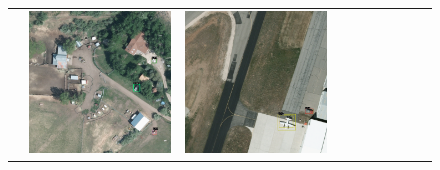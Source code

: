 \begin{figure}[h!]
\begin{tabularx}{\textwidth}{c|*{9}{X}}
    & \includegraphics[trim={850pt 110pt 80pt 830pt},clip,width=\linewidth]{images/015Results/01abb_vs_obb/comp_images/abb/523.png}
    &  \includegraphics[trim={650pt 120pt 170pt 720pt},clip,width=\linewidth]{images/015Results/01abb_vs_obb/comp_images/abb/487.png}

\end{tabularx}
\end{figure}
